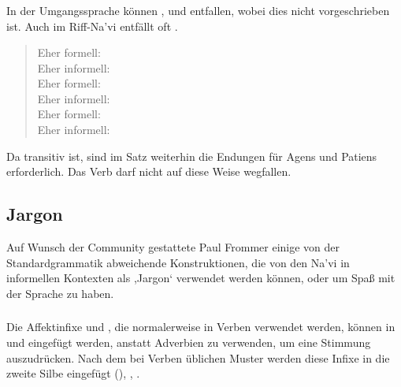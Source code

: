 \subsubsection{} \label{prag:colloq:omit}
In der Umgangssprache können ,  und  entfallen, wobei dies nicht vorgeschrieben ist. Auch im Riff-Na'vi entfällt oft . 

\begin{quotation}
\noindent Eher formell:  \\
\noindent Eher informell:  \\

\noindent Eher formell:  \\
\noindent Eher informell:  \\

\noindent Eher formell:  \\
\noindent Eher informell:  
\end{quotation}

\noindent Da  transitiv ist, sind im Satz  weiterhin die Endungen für Agens und Patiens erforderlich. Das Verb   darf nicht auf diese Weise wegfallen.

\subsection{Jargon} Auf Wunsch der Community gestattete Paul Frommer einige von der Standardgrammatik abweichende Konstruktionen, die von den Na'vi in informellen Kontexten als ,Jargon‘ verwendet werden können, oder um Spaß mit der Sprache zu haben.

\subsubsection{}Die Affektinfixe  und , die normalerweise in Verben verwendet werden, können in   und   eingefügt werden, anstatt Adverbien zu verwenden, um eine Stimmung auszudrücken. Nach dem bei Verben üblichen Muster werden diese Infixe in die zweite Silbe eingefügt (), , .

